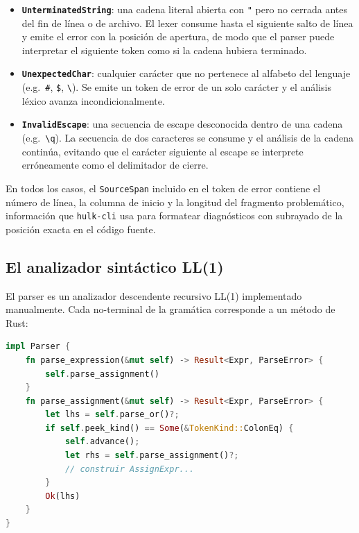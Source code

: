 \documentclass[12pt, a4paper]{article}
\begin{document}
\begin{itemize}
  \item \textbf{\texttt{UnterminatedString}}: una cadena literal abierta con
        \texttt{"} pero no cerrada antes del fin de línea o de archivo. El lexer
        consume hasta el siguiente salto de línea y emite el error con la posición
        de apertura, de modo que el parser puede interpretar el siguiente token
        como si la cadena hubiera terminado.
  \item \textbf{\texttt{UnexpectedChar}}: cualquier carácter que no pertenece al
        alfabeto del lenguaje (e.g.\ \texttt{\#}, \texttt{\$}, \texttt{\textbackslash}).
        Se emite un token de error de un solo carácter y el análisis léxico
        avanza incondicionalmente.
  \item \textbf{\texttt{InvalidEscape}}: una secuencia de escape desconocida
        dentro de una cadena (e.g.\ \texttt{\textbackslash{}q}). La secuencia de
        dos caracteres se consume y el análisis de la cadena continúa, evitando
        que el carácter siguiente al escape se interprete erróneamente como el
        delimitador de cierre.
\end{itemize}

En todos los casos, el \texttt{SourceSpan} incluido en el token de error
contiene el número de línea, la columna de inicio y la longitud del fragmento
problemático, información que \texttt{hulk-cli} usa para formatear diagnósticos
con subrayado de la posición exacta en el código fuente.

\subsection{El analizador sint\'{a}ctico LL(1)}

El parser es un analizador descendente recursivo LL(1) implementado
manualmente. Cada no-terminal de la gram\'{a}tica corresponde a un m\'{e}todo de Rust:

\begin{lstlisting}[language=Rust, caption={Estructura del parser recursivo descendente},
                   label=lst:parser-struct]
impl Parser {
    fn parse_expression(&mut self) -> Result<Expr, ParseError> {
        self.parse_assignment()
    }
    fn parse_assignment(&mut self) -> Result<Expr, ParseError> {
        let lhs = self.parse_or()?;
        if self.peek_kind() == Some(&TokenKind::ColonEq) {
            self.advance();
            let rhs = self.parse_assignment()?;
            // construir AssignExpr...
        }
        Ok(lhs)
    }
}
\end{lstlisting}
\end{document}
